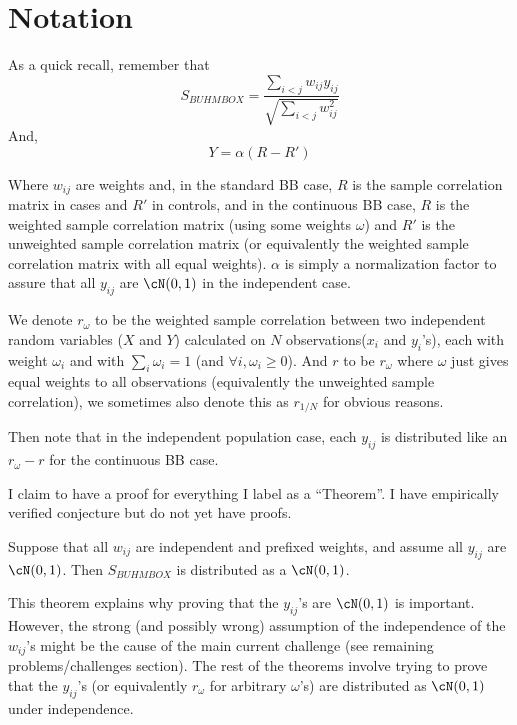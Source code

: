\documentclass[11pt]{hw-template}
\begin{document}
\maketitle

\section*{Notation}
  
    As a quick recall, remember that 
  $$S_{BUHMBOX} = \frac{\sum_{i < j} w_{ij}y_{ij}}{\sqrt{\sum_{i<j}w_{ij}^2}}$$
  And,
  $$Y = \alpha(R-R')$$

  Where $w_{ij}$ are weights and, in the standard BB case, $R$ is the sample correlation matrix in cases and $R'$ in controls, and in the continuous BB case, $R$ is the weighted sample correlation matrix
  (using some weights $\omega$) and $R'$ is the unweighted sample correlation matrix (or equivalently the weighted sample correlation matrix with all equal weights). $\alpha$ is simply a normalization factor
  to assure that all $y_{ij}$ are $\cN(0, 1)$ in the independent case.

  We denote $r_\omega$ to be the weighted sample correlation between two independent random variables ($X$ and $Y$) calculated on $N$ observations($x_i$ and $y_i$'s), each with weight $\omega_i$ and with 
  $\sum_i \omega_i = 1$ (and $\forall i, \omega_i \geq 0$). And $r$ to
  be $r_\omega$ where $\omega$ just gives equal weights to all observations (equivalently the unweighted sample correlation), we sometimes also denote this as $r_{1/N}$ for obvious reasons.

  Then note that in the independent population case, each $y_{ij}$ is distributed like an $r_\omega - r$ for the continuous BB case. 

  I claim to have a proof for everything I label as a ``Theorem''. I have empirically verified conjecture but do not yet have proofs. 

  \begin{theorem}
    Suppose that all $w_{ij}$ are independent and prefixed weights, and assume all $y_{ij}$ are $\cN(0, 1)$. Then $S_{BUHMBOX}$ is distributed as a $\cN(0, 1)$.
  \end{theorem}

  \begin{remark}
    This theorem explains why proving that the $y_{ij}$'s are $\cN(0, 1)$ is important. However, the strong (and possibly wrong) assumption of the independence of the $w_{ij}$'s might be the cause of the main
    current challenge (see remaining problems/challenges section). The rest of the theorems involve trying to prove that the $y_{ij}$'s (or equivalently $r_\omega$ for arbitrary $\omega$'s) are distributed
    as $\cN(0, 1)$ under independence. 
  \end{remark}
\end{document}
